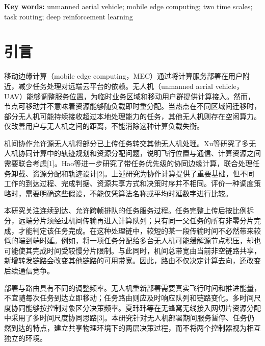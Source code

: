 \vspace{4mm}
\noindent\textbf{Key words:} unmanned aerial vehicle; mobile edge computing; two time scales; task routing; deep reinforcement learning

\vfill
{}

\vspace{4mm}


\section{引言}
移动边缘计算（mobile edge computing，MEC）通过将计算服务部署在用户附近，减少任务处理对远端云平台的依赖。无人机（unmanned aerial vehicle，UAV）能够调整服务位置，为临时业务区域和移动用户群提供计算接入。然而，节点可移动并不意味着资源能够随负载即时重分配。当热点在不同区域间迁移时，部分无人机可能持续接收超过本地处理能力的任务，其他无人机则存在空闲算力。仅改善用户与无人机之间的距离，不能消除这种计算负载失衡。

机间协作允许源无人机将部分已上传任务转交其他无人机处理。Xu等研究了多无人机协同计算中的轨迹规划和资源分配问题，说明飞行位置与通信、计算资源之间需要联合考虑[1]。Hao等进一步研究了带任务优先级的协同边缘计算，联合处理任务卸载、资源分配和轨迹设计[2]。上述研究为协作计算提供了重要基础，但不同工作的到达过程、完成判据、资源共享方式和决策时序并不相同。评价一种调度策略时，需要明确这些假设，不能仅凭算法名称或平均时延数字进行比较。

本研究关注连续到达、允许跨帧排队的任务服务过程。任务完整上传后按比例拆分，远端分片须经过机间传输再进入计算队列；只有同一父任务的所有非零分片完成，才能判定该任务完成。在这种处理链中，较短的某一段传输时间不必然带来较低的端到端时延。例如，将一项任务分配给多台无人机可能缓解源节点积压，却也可能使其完成时间受较慢分片限制。与此同时，机间总带宽由当前非空链路共享，新增转发链路会改变其他链路的可用带宽。因此，路由不仅决定计算去向，还改变后续通信竞争。

部署与路由具有不同的调整频率。无人机重新部署需要真实飞行时间和推进能量，不宜随每次任务到达立即移动；任务路由则应及时响应队列和链路变化。多时间尺度协同能够按控制对象区分决策频率。夏玮玮等在无蜂窝无线接入网切片资源分配中采用了多时间尺度协同思路[3]。本研究针对无人机部署期间服务暂停、任务仍然到达的特点，建立共享物理环境下的两层决策过程，而不将两个控制器视为相互独立的环境。

